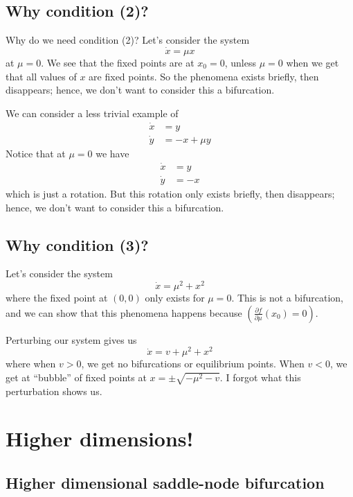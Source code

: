 \documentclass{article}
\begin{document}
\subsection{Why condition (2)?}

Why do we need condition (2)? Let's consider the system
\[
\dot{x}=\mu x
\]
at $\mu=0$. We see that the fixed points are at $x_0=0$, unless $\mu=0$ when we get that all values of $x$ are fixed points. So the phenomena exists briefly, then disappears; hence, we don't want to consider this a bifurcation.

We can consider a less trivial example of 
\begin{align*}
    \dot{x}&= y\\
    \dot{y}&= -x + \mu y
\end{align*}
Notice that at $\mu=0$ we have 
\begin{align*}
    \dot{x}&= y\\
    \dot{y}&= -x
\end{align*}
which is just a rotation. But this rotation only exists briefly, then disappears; hence, we don't want to consider this a bifurcation.

\subsection{Why condition (3)?}

Let's consider the system 
\[
\dot{x}=\mu^2 + x^2
\]
where the fixed point at $(0,0)$ only exists for $\mu=0$. This is not a bifurcation, and we can show that this phenomena happens because $\left(\frac{\partial f}{\partial \mu}(x_0) = 0\right)$.

Perturbing our system gives us 
\[
\dot{x}=v + \mu^2 + x^2
\]
where when $v>0$, we get no bifurcations or equilibrium points. When $v<0$, we get at ``bubble'' of fixed points at $x=\pm\sqrt{-\mu^2 -v}$. I forgot what this perturbation shows us.

\section{Higher dimensions!}

\subsection{Higher dimensional saddle-node bifurcation}
\end{document}
